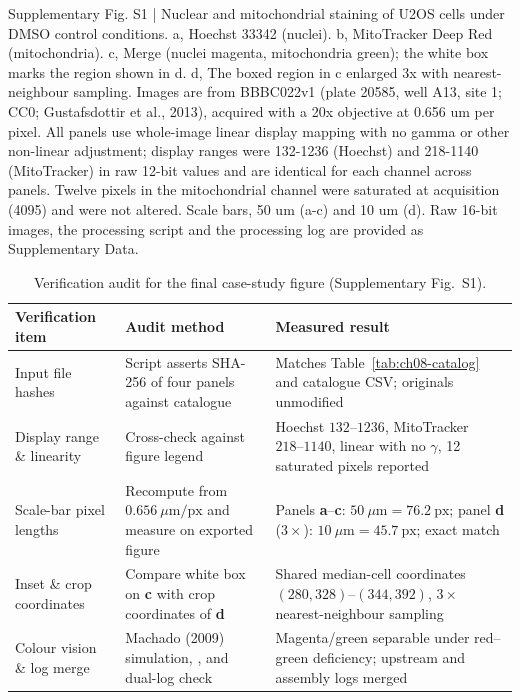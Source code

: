 \begin{Prompt}
Supplementary Fig. S1 | Nuclear and mitochondrial staining of U2OS cells under DMSO control
conditions. a, Hoechst 33342 (nuclei). b, MitoTracker Deep Red (mitochondria). c, Merge
(nuclei magenta, mitochondria green); the white box marks the region shown in d. d, The
boxed region in c enlarged 3x with nearest-neighbour sampling. Images are from BBBC022v1
(plate 20585, well A13, site 1; CC0; Gustafsdottir et al., 2013), acquired with a 20x
objective at 0.656 um per pixel. All panels use whole-image linear display mapping with no
gamma or other non-linear adjustment; display ranges were 132-1236 (Hoechst) and 218-1140
(MitoTracker) in raw 12-bit values and are identical for each channel across panels. Twelve
pixels in the mitochondrial channel were saturated at acquisition (4095) and were not
altered. Scale bars, 50 um (a-c) and 10 um (d). Raw 16-bit images, the processing script
and the processing log are provided as Supplementary Data.
\end{Prompt}

\begin{table}[htbp]\centering\footnotesize
\setlength{\tabcolsep}{3pt}
\renewcommand{\arraystretch}{1.15}
\caption{Verification audit for the final case-study figure (Supplementary Fig.\ S1).}\label{tab:ch08-verify}
\begin{tabularx}{\linewidth}{@{}>{\raggedright\arraybackslash}p{25mm}YY@{}}
\toprule
\textbf{Verification item} & \textbf{Audit method} & \textbf{Measured result} \\
\midrule
Input file hashes & Script asserts SHA-256 of four panels against catalogue & Matches Table~\ref{tab:ch08-catalog} and catalogue CSV; originals unmodified \\
Display range \& linearity & Cross-check  against figure legend & Hoechst $132\text{--}1236$, MitoTracker $218\text{--}1140$, linear with no $\gamma$, 12 saturated pixels reported \\
Scale-bar pixel lengths & Recompute from $0.656\ \mu\text{m/px}$ and measure on exported figure & Panels \textbf{a}--\textbf{c}: $50\ \mu\text{m} = 76.2\ \text{px}$; panel \textbf{d} ($3\times$): $10\ \mu\text{m} = 45.7\ \text{px}$; exact match \\
Inset \& crop coordinates & Compare white box on \textbf{c} with crop coordinates of \textbf{d} & Shared median-cell coordinates $(280, 328)\text{--}(344, 392)$, $3\times$ nearest-neighbour sampling \\
Colour vision \& log merge & Machado (2009) simulation, , and dual-log check & Magenta/green separable under red--green deficiency; upstream and assembly logs merged \\
\bottomrule
\end{tabularx}
\end{table}

